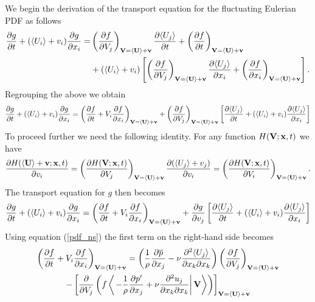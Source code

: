 \documentclass[oneside,a4paper,11pt]{report}
\newcommand{\pavg}{\overline{p}}
\newcommand{\pfluc}{p'}
\newcommand{\uiavg}{\langle U_i \rangle}
\newcommand{\ujavg}{\langle U_j \rangle}
\newcommand{\ujfluc}{u_j}
\begin{document}
We begin the derivation of the transport equation for the fluctuating Eulerian PDF as follows 
\begin{align}
\frac{\partial g}{\partial t} + ( \uiavg + v_i ) \frac{\partial g}{\partial x_i} = & \left ( \frac{\partial f}{\partial V_j} \right )_{\Vvec = \langle \Uvec \rangle + \vvec} \frac{\partial \ujavg}{\partial t} + \left (\frac{\partial f}{\partial t} \right )_{\Vvec = \langle \Uvec \rangle + \vvec} \nonumber \\
&+ ( \uiavg + v_i ) \left [ \left ( \frac{\partial f}{\partial V_j} \right )_{\Vvec = \langle \Uvec \rangle + \vvec} \frac{\partial \ujavg}{\partial x_i} + \left (\frac{\partial f}{\partial x_i} \right )_{\Vvec = \langle \Uvec \rangle + \vvec} \right ].
\end{align}
Regrouping the above we obtain
\begin{equation}
\frac{\partial g}{\partial t} + ( \uiavg + v_i ) \frac{\partial g}{\partial x_i} = \left ( \frac{\partial f}{\partial t} + V_i \frac{\partial f}{\partial x_i} \right )_{\Vvec = \langle \Uvec \rangle + \vvec} + \left ( \frac{\partial f}{\partial V_j} \right )_{\Vvec = \langle \Uvec \rangle + \vvec} \left [ \frac{\partial \ujavg}{\partial t} + (\uiavg + v_i) \frac{\partial \ujavg}{\partial x_i} \right ]
\end{equation}
To proceed further we need the following identity. For any function $H(\mathbf{V}; \mathbf{x}, t)$ we have
\begin{equation}
\label{deriv_v}
\frac{\partial H(\langle \Uvec \rangle + \vvec; \xvec, t)}{\partial v_i} = \left ( \frac{\partial H(\Vvec; \xvec, t)}{\partial V_j} \right)_{\Vvec = \langle \Uvec \rangle + \vvec} \frac{\partial ( \ujavg + v_j) }{\partial v_i} = \left ( \frac{\partial H(\Vvec; \xvec,t )}{\partial V_i} \right)_{\Vvec = \langle \Uvec \rangle + \vvec}.
\end{equation}
The transport equation for $g$ then becomes
\begin{equation}
\frac{\partial g}{\partial t} + ( \uiavg + v_i ) \frac{\partial g}{\partial x_i} = \left ( \frac{\partial f}{\partial t} + V_i \frac{\partial f}{\partial x_i} \right )_{\Vvec = \langle \Uvec \rangle + \vvec} + \frac{\partial g}{\partial v_j} \left [ \frac{\partial \ujavg}{\partial t} + (\uiavg + v_i) \frac{\partial \ujavg}{\partial x_i} \right ]
\end{equation}
Using equation (\ref{pdf_ns}) the first term on the right-hand side becomes
\begin{multline}
\left ( \frac{\partial f}{\partial t} + V_i \frac{\partial f}{\partial x_i} \right )_{\Vvec = \langle \Uvec \rangle + \vvec} = \left ( \frac{1}{\rho} \frac{\partial \pavg}{\partial x_j} -\nu \frac{\partial^2 \ujavg}{\partial x_k \partial x_k} \right) \left (\frac{\partial f}{\partial V_j} \right)_{\Vvec = \langle \Uvec \rangle + \vvec} \\
- \left [ \frac{\partial}{\partial V_j} \left ( f \left < \left . - \frac{1}{\rho} \frac{\partial \pfluc}{\partial x_j} +  \nu \frac{\partial ^2 \ujfluc}{\partial x_k \partial x_k} \right | \Vvec \right > \right ) \right ]_{\Vvec = \langle \Uvec \rangle + \vvec} 
\end{multline}
\end{document}
